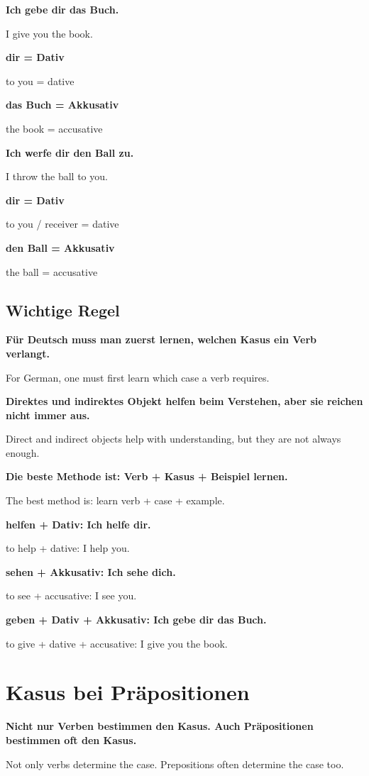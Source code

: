 \documentclass[a4paper]{article}
\newcommand{\EN}[1]{\par{\small\textcolor{TranslationGray}{#1}}\vspace{0.4em}}
\begin{document}
            \textbf{Ich gebe dir das Buch.}
            \EN{I give you the book.}
            
            \textbf{dir = Dativ}
            \EN{to you = dative}
            
            \textbf{das Buch = Akkusativ}
            \EN{the book = accusative}
            
            \textbf{Ich werfe dir den Ball zu.}
            \EN{I throw the ball to you.}
            
            \textbf{dir = Dativ}
            \EN{to you / receiver = dative}
            
            \textbf{den Ball = Akkusativ}
            \EN{the ball = accusative}
        
        \subsection{Wichtige Regel}
            
            \textbf{Für Deutsch muss man zuerst lernen, welchen Kasus ein Verb verlangt.}
            \EN{For German, one must first learn which case a verb requires.}
            
            \textbf{Direktes und indirektes Objekt helfen beim Verstehen, aber sie reichen nicht immer aus.}
            \EN{Direct and indirect objects help with understanding, but they are not always enough.}
            
            \textbf{Die beste Methode ist: Verb + Kasus + Beispiel lernen.}
            \EN{The best method is: learn verb + case + example.}
            
            \textbf{helfen + Dativ: Ich helfe dir.}
            \EN{to help + dative: I help you.}
            
            \textbf{sehen + Akkusativ: Ich sehe dich.}
            \EN{to see + accusative: I see you.}
            
            \textbf{geben + Dativ + Akkusativ: Ich gebe dir das Buch.}
            \EN{to give + dative + accusative: I give you the book.}
    
    
    \section{Kasus bei Präpositionen}
        
        \textbf{Nicht nur Verben bestimmen den Kasus. Auch Präpositionen bestimmen oft den Kasus.}
        \EN{Not only verbs determine the case. Prepositions often determine the case too.}
        
\end{document}
